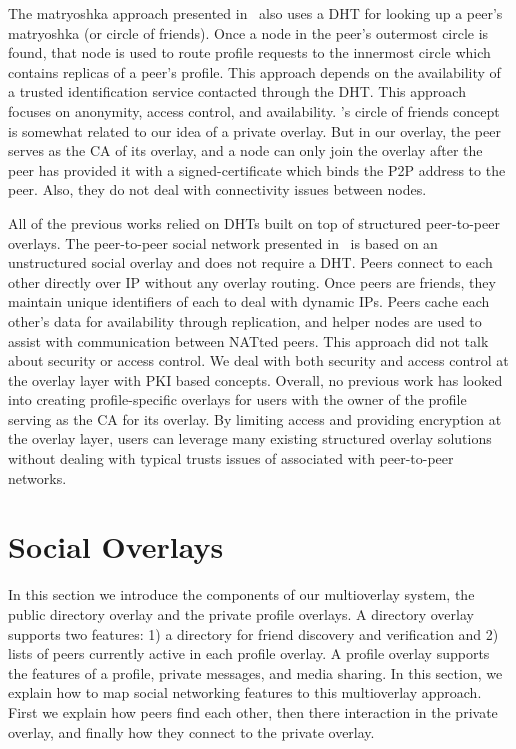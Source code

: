 \documentclass[letterpaper,twocolumn,10pt]{article}
\begin{document}
The matryoshka approach presented in~\cite{matryoshka} also uses a DHT for
looking up a peer's matryoshka (or circle of friends). Once a node in the 
peer's outermost circle is found, that node is used to route profile requests to 
the innermost circle which contains replicas of a peer's profile. This
approach depends on the availability of a trusted identification service
contacted through the DHT. This approach focuses on anonymity, access control,
and availability. \cite{matryoshka}'s circle of friends concept
is somewhat related to our idea of a private overlay. But in our overlay,
the peer serves as the CA of its overlay, and a node can only join the
overlay after the peer has provided it with a signed-certificate which binds
the P2P address to the peer. Also, they do not deal with connectivity issues
between nodes.

All of the previous works relied on DHTs built on top of structured 
peer-to-peer overlays. The peer-to-peer social network presented
in~\cite{tribler-osn} is based on an unstructured social overlay
and does not require a DHT. Peers connect to each other directly over IP
without any overlay routing. Once peers are friends, they maintain
unique identifiers of each to deal with dynamic IPs. Peers cache each
other's data for availability through replication, and helper nodes
are used to assist with communication between NATted peers. This
approach did not talk about security or access control. We deal with
both security and access control at the overlay layer with PKI based
concepts. Overall, no previous work has looked into creating profile-specific
overlays for users with the owner of the profile serving as the CA
for its overlay. By limiting access and providing encryption at the overlay
layer, users can leverage many existing structured overlay solutions without
dealing with typical trusts issues of associated with peer-to-peer networks.

\section{Social Overlays}
\label{social_overlays}
In this section we introduce the components of our multioverlay system,
the public directory overlay and the private profile overlays.  A directory
overlay supports two features:  1) a directory for friend discovery and
verification and 2) lists of peers currently active in each profile overlay.
A profile overlay supports the features of a profile, private messages, and
media sharing.  In this section, we explain how to map social networking
features to this multioverlay approach.  First we explain how peers find
each other, then there interaction in the private overlay, and finally how
they connect to the private overlay.
\end{document}
